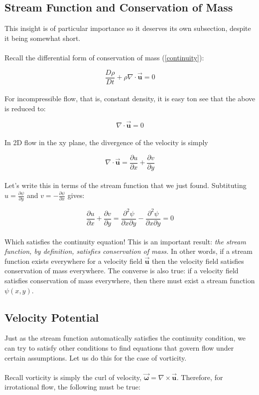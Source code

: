 \documentclass[11pt]{article}
\begin{document}
\subsection{Stream Function and Conservation of Mass}
This insight is of particular importance so it deserves its own subsection, despite it being somewhat short. \\ \\
\noindent
Recall the differential form of conservation of mass (\ref{continuity}):

\begin{equation*}
    \frac{D\rho}{Dt} + \rho\nabla \cdot \vec{\bm{u}} = 0
\end{equation*}\\
\noindent
For incompressible flow, that is, constant density, it is easy ton see that the above is reduced to:

\begin{equation*}
    \nabla \cdot \vec{\bm{u}} = 0
\end{equation*}\\
\noindent
In 2D flow in the xy plane, the divergence of the velocity is simply

\begin{equation*}
    \nabla \cdot \vec{\bm{u}} = \frac{\partial u}{\partial x} + \frac{\partial v}{\partial y}
\end{equation*}\\ 
\noindent
Let's write this in terms of the stream function that we just found. Subtituting $u = \frac{\partial \psi}{\partial y}$ and $v = -\frac{\partial \psi}{\partial x}$ gives:

\begin{equation*}
    \frac{\partial u}{\partial x} + \frac{\partial v}{\partial y} = \frac{\partial^2\psi}{\partial x \partial y} - \frac{\partial^2\psi}{\partial x \partial y} = 0
\end{equation*} \\ 
\noindent
Which satisfies the continuity equation! This is an important result: \emph{the stream function, by definition, satisfies conservation of mass.} In other words, if a stream function exists everywhere for a velocity field $\vec{\bm{u}}$ then the velocity field satisfies conservation of mass everywhere. The converse is also true: if a velocity field satisfies conservation of mass everywhere, then there must exist a stream function $\psi(x,y)$.

\subsection{Velocity Potential}
Just as the stream function automatically satisfies the continuity condition, we can try to satisfy other conditions to find equations that govern flow under certain assumptions. Let us do this for the case of vorticity.\\ \\
\noindent
Recall vorticity is simply the curl of velocity, $\vec{\bm{\omega}} = \nabla \times \vec{\bm{u}}$. Therefore, for irrotational flow, the following must be true:
\end{document}
